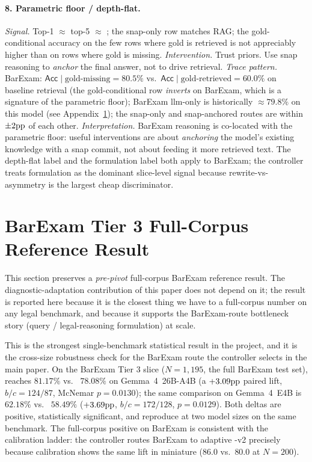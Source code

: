 \paragraph{8. Parametric floor / depth-flat.}
\emph{Signal.} Top-1 $\approx$ top-5 $\approx$ ; the
snap-only row matches RAG; the gold-conditional accuracy on the few
rows where gold is retrieved is not appreciably higher than on rows
where gold is missing.
\emph{Intervention.} Trust priors. Use snap reasoning to \emph{anchor}
the final answer, not to drive retrieval.
\emph{Trace pattern.} BarExam: $\textsf{Acc}\!\mid\!\text{gold-missing}
= 80.5\%$ vs.\ $\textsf{Acc}\!\mid\!\text{gold-retrieved} = 60.0\%$ on
baseline retrieval (the gold-conditional row \emph{inverts} on BarExam,
which is a signature of the parametric floor); BarExam llm-only is
historically $\approx 79.8\%$ on this model (see
Appendix~\ref{app:barexam_tier3}); the snap-only and snap-anchored
routes are within $\pm 2\mathrm{pp}{}$ of each other.
\emph{Interpretation.} BarExam reasoning is co-located with the
parametric floor: useful interventions are about \emph{anchoring} the
model's existing knowledge with a snap commit, not about feeding it more
retrieved text. The depth-flat label and the formulation label both
apply to BarExam; the controller treats formulation as the dominant
slice-level signal because rewrite-vs-\hyre{} asymmetry is the largest
cheap discriminator.

\section{BarExam Tier 3 Full-Corpus Reference Result}\label{app:barexam_tier3}

This section preserves a \emph{pre-pivot} full-corpus BarExam reference
result. The diagnostic-adaptation contribution of this paper does not
depend on it; the result is reported here because it is the closest thing
we have to a full-corpus number on any legal benchmark, and because it
supports the BarExam-route bottleneck story
(query / legal-reasoning formulation) at scale.

This is the strongest single-benchmark statistical result in the project,
and it is the cross-size robustness check for the BarExam route the
controller selects in the main paper. On the BarExam Tier 3 slice
($N{=}1{,}195$, the full BarExam test set), 
reaches $81.17\%$ vs.\  $78.08\%$ on Gemma~4~26B-A4B
(a $+3.09\mathrm{pp}{}$ paired lift, $b/c{=}124/87$, McNemar $p{=}0.0130$); the
same comparison on Gemma~4~E4B is  $62.18\%$ vs.\
 $58.49\%$ ($+3.69\mathrm{pp}{}$, $b/c{=}172/128$,
$p{=}0.0129$). Both deltas are positive, statistically significant, and
reproduce at two model sizes on the same benchmark. The full-corpus
positive on BarExam is consistent with the calibration ladder: the
controller routes BarExam to adaptive \hyre{}-v2 precisely because
calibration shows the same lift in miniature ($86.0$ vs.\ $80.0$ at
$N{=}200$).

